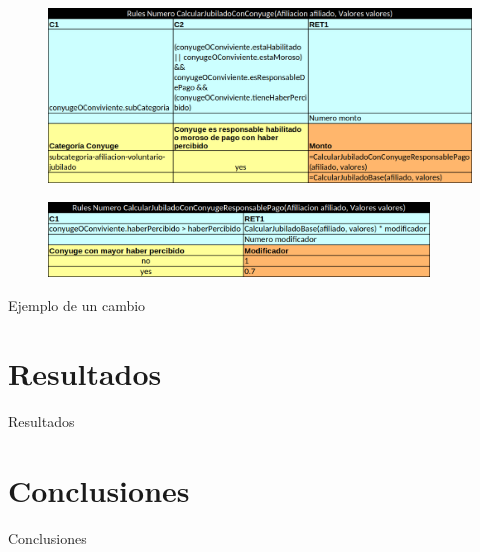 \documentclass[10pt]{beamer}
\begin{document}
\begin{frame}
    \begin{figure}
        \centering
        \includegraphics[width=\textwidth]{tables/jubiladoConConyuge.png}
    \end{figure}
    \begin{figure}
        \centering
        \includegraphics[width=0.9\textwidth]{tables/jubiladoConConyugeResponsable.png}
    \end{figure}
\end{frame}

\begin{frame}{Ejemplo de un cambio}
    
\end{frame}

\section{Resultados}

\begin{frame}{Resultados}
    
\end{frame}

\section{Conclusiones}

\begin{frame}{Conclusiones}
    
\end{frame}

\end{document}

